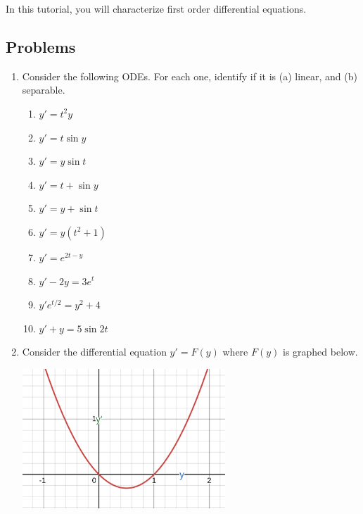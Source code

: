\begin{objectives}
	In this tutorial, you will characterize first order differential equations.
\end{objectives}

\subsection*{Problems}
\begin{enumerate}
    \item Consider the following ODEs. For each one, identify if it is (a) linear, and (b) separable.

    \begin{tcolorbox}[sharp corners=all,colframe=tolGrey,colback=white]
        \begin{multicols}{2}
        \begin{enumerate}[label={(\roman{enumii})},nosep,itemsep=1mm]
            \item $y'=t^2y$
            \item $y'=t\sin y$
            \item $y'=y\sin t$
            \item $y'=t+\sin y$
            \item $y'=y+\sin t$
            \item $y'=y(t^2+1)$
            \item $y'=e^{2t-y}$
            \item $y'-2y=3e^t$
            \item $y'e^{t/2}=y^2+4$
            \item $y'+y=5\sin 2t$
        \end{enumerate}
        \end{multicols}
    \end{tcolorbox}


    \item Consider the differential equation $y'=F(y)$ where $F(y)$ is graphed
    below.

    \begin{center}
    \includegraphics[width=3in]{resources/tutorial-07-phase1.png}
    \end{center}


\end{enumerate}
